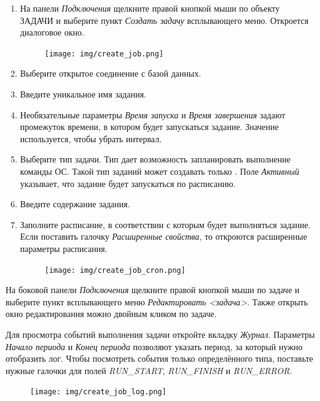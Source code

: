 \begin{enumerate}[leftmargin=26pt]
	\item На панели \textit{Подключения} щелкните правой кнопкой мыши по объекту ЗАДАЧИ и выберите пункт \textit{Создать задачу} всплывающего меню. Откроется диалоговое окно.
	\begin{figure}[H]
		\centering
		\texttt{[image: img/create\_job.png]}
	\end{figure}
	\item Выберите открытое соединение с базой данных.
	\item Введите уникальное имя задания.
	\item Необязательные параметры \textit{Время запуска} и \textit{Время завершения} задают промежуток времени, в котором будет запускаться задание. Значение  используется, чтобы убрать интервал. 
	\item Выберите тип задачи. Тип  дает возможность запланировать выполнение команды ОС. Такой тип заданий может создавать только . Поле \textit{Активный} указывает, что задание будет запускаться по расписанию. 
	\item Введите содержание задания. 
	\item Заполните расписание, в соответствии с которым будет выполняться задание. Если поставить галочку \textit{Расширенные свойства}, то откроются расширенные параметры расписания.
	\begin{figure}[H]
		\centering
		\texttt{[image: img/create\_job\_cron.png]}
	\end{figure}
\end{enumerate}


На боковой панели \textit{Подключения} щелкните правой кнопкой мыши по задаче и выберите пункт всплывающего меню \textit{Редактировать <задача>}. Также открыть окно редактирования можно двойным кликом по задаче.

Для просмотра событий выполнения задачи откройте вкладку \textit{Журнал}. Параметры \textit{Начало периода} и \textit{Конец периода} позволяют указать период, за который нужно отобразить лог. Чтобы посмотреть события только определённого типа, поставьте нужные галочки для полей \textit{RUN\_START}, \textit{RUN\_FINISH} и \textit{RUN\_ERROR}.
\begin{figure}[H]
	\centering
	\texttt{[image: img/create\_job\_log.png]}
\end{figure}


